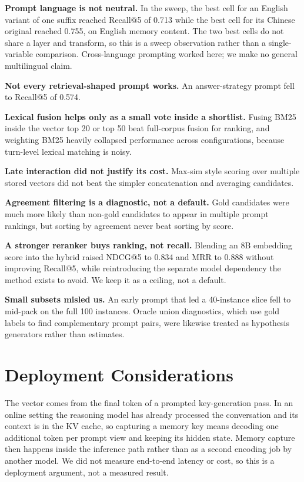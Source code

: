 \documentclass[
  10pt,
  letterpaper,
]{article}
\begin{document}
\textbf{Prompt language is not neutral.} In the sweep, the best cell for
an English variant of one suffix reached Recall@5 of 0.713 while the
best cell for its Chinese original reached 0.755, on English memory
content. The two best cells do not share a layer and transform, so this
is a sweep observation rather than a single-variable comparison.
Cross-language prompting worked here; we make no general multilingual
claim.

\textbf{Not every retrieval-shaped prompt works.} An answer-strategy
prompt fell to Recall@5 of 0.574.

\textbf{Lexical fusion helps only as a small vote inside a shortlist.}
Fusing BM25 inside the vector top 20 or top 50 beat full-corpus fusion
for ranking, and weighting BM25 heavily collapsed performance across
configurations, because turn-level lexical matching is noisy.

\textbf{Late interaction did not justify its cost.} Max-sim style
scoring over multiple stored vectors did not beat the simpler
concatenation and averaging candidates.

\textbf{Agreement filtering is a diagnostic, not a default.} Gold
candidates were much more likely than non-gold candidates to appear in
multiple prompt rankings, but sorting by agreement never beat sorting by
score.

\textbf{A stronger reranker buys ranking, not recall.} Blending an 8B
embedding score into the hybrid raised NDCG@5 to 0.834 and MRR to 0.888
without improving Recall@5, while reintroducing the separate model
dependency the method exists to avoid. We keep it as a ceiling, not a
default.

\textbf{Small subsets misled us.} An early prompt that led a 40-instance
slice fell to mid-pack on the full 100 instances. Oracle union
diagnostics, which use gold labels to find complementary prompt pairs,
were likewise treated as hypothesis generators rather than estimates.

\section{Deployment Considerations}\label{deployment-considerations}

The vector comes from the final token of a prompted key-generation pass.
In an online setting the reasoning model has already processed the
conversation and its context is in the KV cache, so capturing a memory
key means decoding one additional token per prompt view and keeping its
hidden state. Memory capture then happens inside the inference path
rather than as a second encoding job by another model. We did not
measure end-to-end latency or cost, so this is a deployment argument,
not a measured result.
\end{document}
